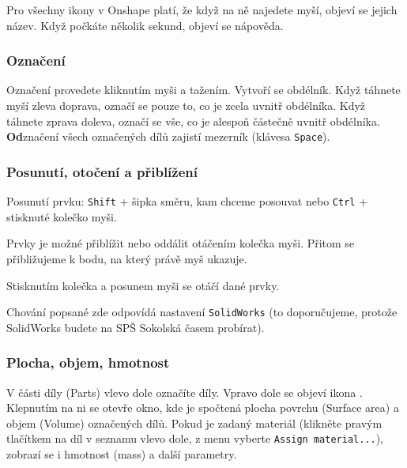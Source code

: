 Pro všechny ikony v Onshape platí, že když na ně najedete myší, objeví se jejich název. 
Když počkáte několik sekund, objeví se nápověda. 






\subsubsection{Označení}

Označení provedete kliknutím myši a tažením. Vytvoří se obdélník. Když táhnete myší zleva doprava, označí se pouze to, co je zcela uvnitř obdélníka. 
Když táhnete zprava doleva, označí se vše, co je alespoň částečně uvnitř obdélníka. \textbf{Od}značení všech označených dílů zajistí mezerník (klávesa {\tt Space}). 


\subsubsection{Posunutí, otočení a přiblížení}

Posunutí prvku: {\tt Shift}  + šipka směru, kam chceme posouvat nebo {\tt Ctrl} + stisknuté kolečko myši.  

Prvky je možné přiblížit nebo oddálit otáčením kolečka myši. Přitom se přibližujeme k bodu, na který právě myš ukazuje. 

Stisknutím kolečka a posunem myši se otáčí dané prvky. 

Chování popsané zde odpovídá nastavení \texttt{SolidWorks} (to doporučujeme, protože SolidWorks budete na SPŠ Sokolská časem probírat).


\subsubsection{Plocha, objem, hmotnost}

V části díly (Parts) vlevo dole označíte díly. Vpravo dole se objeví ikona . 
Klepnutím na ni se otevře okno, kde je spočtená plocha povrchu (Surface area) a objem (Volume) označených dílů. 
Pokud je zadaný materiál (klikněte pravým tlačítkem na díl v seznamu vlevo dole, z menu vyberte {\tt Assign material...}), zobrazí se i hmotnost (mass) a další parametry.


